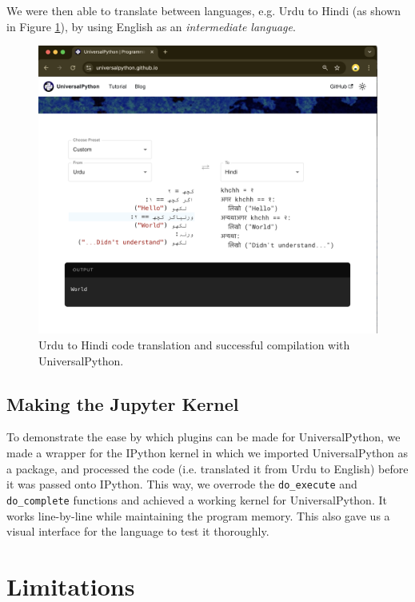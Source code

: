\documentclass[conference]{IEEEtran}
\begin{document}
We were then able to translate between languages, e.g. Urdu to Hindi (as shown in Figure \ref{language-to-language}), by using English as an \textit{intermediate language}.

\begin{figure}[htbp]
\centerline{\includegraphics[width=\columnwidth]{UniversalPython-language-to-language.png}}
\caption{Urdu to Hindi code translation and successful compilation with UniversalPython.}
\label{language-to-language}
\end{figure}

\subsection{Making the Jupyter Kernel}

To demonstrate the ease by which plugins can be made for UniversalPython, we made a wrapper for the IPython kernel in which we imported UniversalPython as a package, and processed the code (i.e. translated it from Urdu to English) before it was passed onto IPython. This way, we overrode the \verb|do_execute| and \verb|do_complete| functions and achieved a working kernel for UniversalPython. It works line-by-line while maintaining the program memory. This also gave us a visual interface for the language to test it thoroughly.

\section{Limitations}
\end{document}
